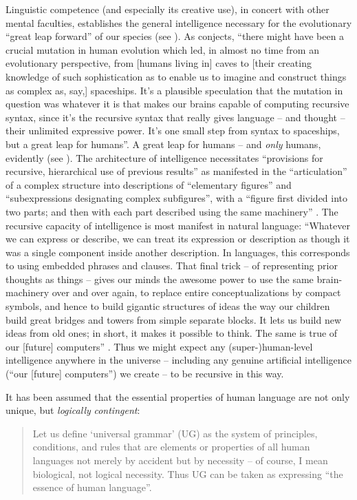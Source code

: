 \documentclass[output=paper]{langsci/langscibook}
\begin{document}
Linguistic competence (and especially its creative use), in concert with other
mental faculties, establishes the general intelligence necessary for the
evolutionary “great leap forward” of our species (see \citealt{Chomsky2016book}).
As \citet[182]{Roberts2017} conjects, “there might have been a crucial mutation
in human evolution which led, in almost no time from an evolutionary
perspective, from [humans living in] caves to [their creating knowledge of such
sophistication as to enable us to imagine and construct things as complex as,
say,] spaceships. It’s a plausible speculation that the mutation in question
was whatever it is that makes our brains capable of computing recursive syntax,
since it’s the recursive syntax that really gives language – and thought –
their unlimited expressive power. It’s one small step from syntax to
spaceships, but a great leap for humans”. A great leap for humans – and
\emph{only} humans, evidently (see \citealt{BerwickChomsky2016}). The
architecture of intelligence necessitates “provisions for recursive,
hierarchical use of previous results” as manifested in the “articulation” of a
complex structure into descriptions of “elementary figures” and “subexpressions
designating complex subfigures”, with a “figure first divided into two parts;
and then with each part described using the same machinery”
\citep[16]{Minsky1963}. The recursive capacity of intelligence is most manifest
in natural language: “Whatever we can express or describe, we can treat its
expression or description as though it was a single component inside another
description. In languages, this corresponds to using embedded phrases and
clauses. That final trick – of representing prior thoughts as things – gives
our minds the awesome power to use the same brain-machinery over and over
again, to replace entire conceptualizations by compact symbols, and hence to
build gigantic structures of ideas the way our children build great bridges and
towers from simple separate blocks. It lets us build new ideas from old ones;
in short, it makes it possible to think. The same is true of our [future]
computers” \citep[124]{Minsky1985}. Thus we might expect any
(super-)human-level intelligence anywhere in the universe – including any
genuine artificial intelligence (“our [future] computers”) we create – to be
recursive in this way.

It has been assumed that the essential properties of human language are not
only unique, but \emph{logically} \emph{contingent}:

\begin{quote}Let us define ‘universal grammar’ (\gls{UG}) as the system of
principles, conditions, and rules that are elements or properties of all human
languages not merely by accident but by necessity – of course, I mean
biological, not logical necessity. Thus \gls{UG} can be taken as expressing
\enquote{the essence of human language}. \citep[29]{Chomsky1975}
\end{quote}
\end{document}
